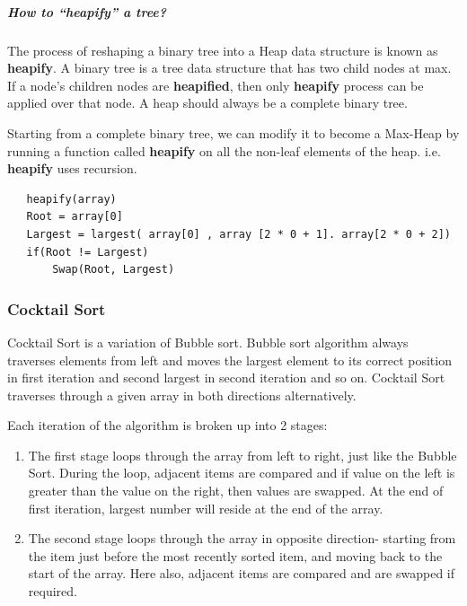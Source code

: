 \documentclass[a4paper, 12pt]{article}
\begin{document}
\subparagraph{How to “heapify” a tree?}

\hfill \break
\indent The process of reshaping a binary tree into a Heap data structure is known 
as \textbf{heapify}. A binary tree is a tree data structure that has two child nodes at max. 
If a node's children nodes are \textbf{heapified}, then only \textbf{heapify} process can be applied 
over that node. A heap should always be a complete binary tree. 

Starting from a complete binary tree, we can modify it to become a Max-Heap by 
running a function called \textbf{heapify} on all the non-leaf elements of the heap. i.e. 
\textbf{heapify} uses recursion.

\hfill \break
\begin{lstlisting}
   heapify(array)
   Root = array[0]
   Largest = largest( array[0] , array [2 * 0 + 1]. array[2 * 0 + 2])
   if(Root != Largest)
       Swap(Root, Largest)
\end{lstlisting}

\newpage

\subsubsection{Cocktail Sort}

Cocktail Sort is a variation of Bubble sort. 
Bubble sort algorithm always traverses elements from left 
and moves the largest element to its correct position in first 
iteration and second largest in second iteration and so on. Cocktail 
Sort traverses through a given array in both directions alternatively. 

Each iteration of the algorithm is broken up into 2 stages: 

\begin{enumerate}
  \item The first stage loops through the array from left to right, just like the Bubble Sort. During the loop, adjacent items are compared and if value on the left is greater than the value on the right, then values are swapped. At the end of first iteration, largest number will reside at the end of the array.
  \item The second stage loops through the array in opposite direction- starting from the item just before the most recently sorted item, and moving back to the start of the array. Here also, adjacent items are compared and are swapped if required.
\end{enumerate}

\newpage
\end{document}
